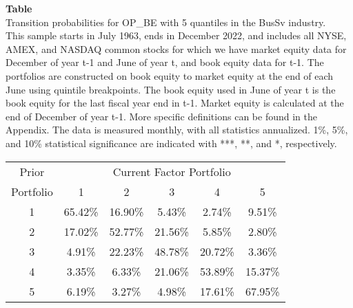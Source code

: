 \begin{table*}[ht!]
\raggedright
{}
\label{tab: transition_probs_OP_BE_BusSv_with_5_quantiles}
\textbf{Table \thetable} \\
Transition probabilities for OP_BE with 5 quantiles in the BusSv industry. \\
\hspace*{1em}This sample starts in July 1963, ends in December 2022, and includes all NYSE, AMEX, and NASDAQ common stocks for which we have market equity data for December of year t-1 and June of year t, and book equity data for t-1. The portfolios are constructed on book equity to market equity at the end of each June using quintile breakpoints.  The book equity used in June of year t is the book equity for the last fiscal year end in t-1.  Market equity is calculated at the end of December of year t-1.  More specific definitions can be found in the Appendix.  The data is measured monthly, with all statistics annualized.  1\%, 5\%, and 10\% statistical significance are indicated with ***, **, and *, respectively. \\
\vspace{0.5em}
\centering
\begin{adjustbox}{max width=\textwidth}
\begin{tabular}{@{}cccccc@{}}
\toprule
Prior & \multicolumn{5}{c}{Current Factor Portfolio} \\
Portfolio & 1 & 2 & 3 & 4 & 5 \\
\midrule
1 & 65.42\% & 16.90\% & 5.43\% & 2.74\% & 9.51\% \\
2 & 17.02\% & 52.77\% & 21.56\% & 5.85\% & 2.80\% \\
3 & 4.91\% & 22.23\% & 48.78\% & 20.72\% & 3.36\% \\
4 & 3.35\% & 6.33\% & 21.06\% & 53.89\% & 15.37\% \\
5 & 6.19\% & 3.27\% & 4.98\% & 17.61\% & 67.95\% \\
\bottomrule
\end{tabular}
\end{adjustbox}
\end{table*}
